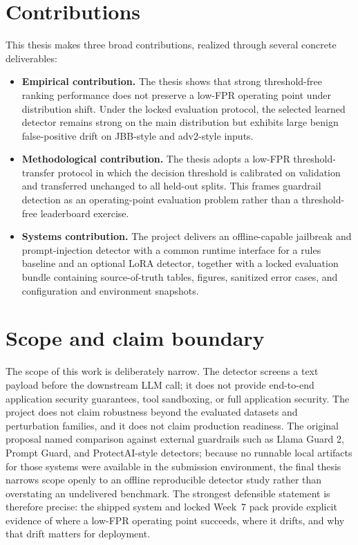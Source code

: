 \section{Contributions}

This thesis makes three broad contributions, realized through several concrete deliverables:
\begin{itemize}
  \item \textbf{Empirical contribution.} The thesis shows that strong threshold-free ranking performance does not preserve a low-FPR operating point under distribution shift. Under the locked evaluation protocol, the selected learned detector remains strong on the main distribution but exhibits large benign false-positive drift on JBB-style and adv2-style inputs.
  \item \textbf{Methodological contribution.} The thesis adopts a low-FPR threshold-transfer protocol in which the decision threshold is calibrated on validation and transferred unchanged to all held-out splits. This frames guardrail detection as an operating-point evaluation problem rather than a threshold-free leaderboard exercise.
  \item \textbf{Systems contribution.} The project delivers an offline-capable jailbreak and prompt-injection detector with a common runtime interface for a rules baseline and an optional LoRA detector, together with a locked evaluation bundle containing source-of-truth tables, figures, sanitized error cases, and configuration and environment snapshots.
\end{itemize}

\section{Scope and claim boundary}

The scope of this work is deliberately narrow. The detector screens a text payload before the downstream LLM call; it does not provide end-to-end application security guarantees, tool sandboxing, or full application security. The project does not claim robustness beyond the evaluated datasets and perturbation families, and it does not claim production readiness. The original proposal named comparison against external guardrails such as Llama Guard 2, Prompt Guard, and ProtectAI-style detectors; because no runnable local artifacts for those systems were available in the submission environment, the final thesis narrows scope openly to an offline reproducible detector study rather than overstating an undelivered benchmark. The strongest defensible statement is therefore precise: the shipped system and locked Week~7 pack provide explicit evidence of where a low-FPR operating point succeeds, where it drifts, and why that drift matters for deployment.

